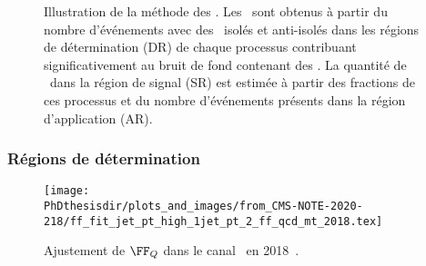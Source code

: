 \begin{figure}[h]
\centering

\caption[Illustration de la méthode des \fakefactors.]{Illustration de la méthode des \fakefactors. Les \fakefactors\ sont obtenus à partir du nombre d'événements avec des \tauh\ isolés et anti-isolés dans les régions de détermination (DR) de chaque processus contribuant significativement au bruit de fond contenant des \ftauhs. La quantité de \ftauhs\ dans la région de signal (SR) est estimée à partir des fractions de ces processus et du nombre d'événements présents dans la région d'application (AR).}
\label{fig-chapter-HTT_analysis-section-bg_estimation-FF_method-ppe}
\end{figure}
\subsubsection{Régions de détermination}
\begin{wrapfigure}{R}{0.45\textwidth}
\texttt{[image: \\PhDthesisdir/plots\_and\_images/from\_CMS-NOTE-2020-218/ff\_fit\_jet\_pt\_high\_1jet\_pt\_2\_ff\_qcd\_mt\_2018.tex]}
\caption[Ajustement de $\FF_Q$ dans le canal \mu\tauh\ en 2018.]{Ajustement de $\FF_Q$ dans le canal \mu\tauh\ en 2018~\cite{CMS-NOTE-2020-218}.}
\label{fig-chapter-HTT_analysis-section-bg_estimation-FF_method-FFQ_fit}
\end{wrapfigure}
